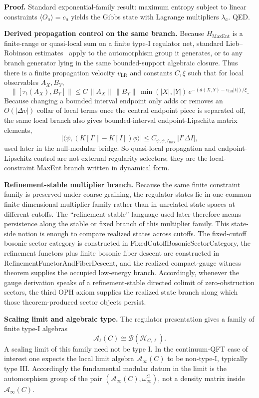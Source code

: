 \textbf{Proof.} Standard exponential-family result: maximum entropy subject to linear constraints \(\langle O_a\rangle=c_a\) yields the Gibbs state with Lagrange multipliers \(\lambda_a\). QED.

\textbf{Derived propagation control on the same branch.} Because \(H_{\mathrm{MaxEnt}}\) is a finite-range or quasi-local sum on a finite type-I regulator net, standard Lieb--Robinson estimates~\cite{liebRobinson72} apply to the automorphism group it generates, or to any branch generator lying in the same bounded-support algebraic closure. Thus there is a finite propagation velocity \(v_{\mathrm{LR}}\) and constants \(C,\xi\) such that for local observables \(A_X,B_Y\),
\[
\bigl\|[\tau_t(A_X),B_Y]\bigr\|
\le
C\,\|A_X\|\,\|B_Y\|\,\min(|X|,|Y|)\,
e^{-(d(X,Y)-v_{\mathrm{LR}}|t|)/\xi}.
\]
Because changing a bounded interval endpoint only adds or removes an \(O(|\Delta v|)\) collar of local terms once the central endpoint piece is separated off, the same local branch also gives bounded-interval endpoint-Lipschitz matrix elements,
\[
\left|\langle\psi,(K[I']-K[I])\phi\rangle\right|
\le
C_{\psi,\phi,I_{\max}}\,|I'\Delta I|,
\]
used later in the null-modular bridge. So quasi-local propagation and endpoint-Lipschitz control are not external regularity selectors; they are the local-constraint MaxEnt branch written in dynamical form.

\textbf{Refinement-stable multiplier branch.} Because the same finite constraint family is preserved under coarse-graining, the regulator states lie in one common finite-dimensional multiplier family rather than in unrelated state spaces at different cutoffs. The ``refinement-stable'' language used later therefore means persistence along the stable or fixed branch of this multiplier family. This state-side notion is enough to compare realized states across cutoffs. The fixed-cutoff bosonic sector category is constructed in FixedCutoffBosonicSectorCategory, the refinement functors plus finite bosonic fiber descent are constructed in RefinementFunctorAndFiberDescent, and the realized compact-gauge witness theorem supplies the occupied low-energy branch. Accordingly, whenever the gauge derivation speaks of a refinement-stable directed colimit of zero-obstruction sectors, the third OPH axiom supplies the realized state branch along which those theorem-produced sector objects persist.

\textbf{Scaling limit and algebraic type.} The regulator presentation gives a family of finite type-I algebras
\[
\mathcal A_{\ell}(C)\cong \mathcal B(\mathcal H_{C,\ell}).
\]
A scaling limit of this family need not be type I. In the continuum-QFT case of interest one expects the local limit algebra \(\mathcal A_\infty(C)\) to be non-type-I, typically type III. Accordingly the fundamental modular datum in the limit is the automorphism group of the pair \((\mathcal A_\infty(C),\omega_\infty^C)\), not a density matrix inside \(\mathcal A_\infty(C)\).

